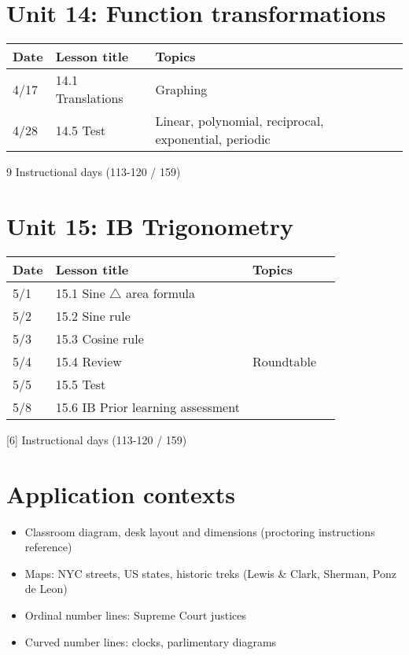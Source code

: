 \documentclass[12pt, twoside]{article}
\begin{document}
\section*{Unit 14: Function transformations}
\begin{tabular}{|p{0.9cm}|p{4cm}|p{7cm}|p{5cm}|}
  \hline
  Date & Lesson title & Topics  &  \\
  \hline
  4/17 & 14.1 Translations & Graphing &  \\
  \hline
  4/28 & 14.5 Test & Linear, polynomial, reciprocal, exponential, periodic &  \\
  \hline


\end{tabular} \par \vspace*{0.3cm}
9 Instructional days (113-120 / 159)

\section*{Unit 15: IB Trigonometry}
\begin{tabular}{|p{0.9cm}|p{4cm}|p{7cm}|p{5cm}|}
  \hline
  Date & Lesson title & Topics  &  \\
  \hline
  5/1 & 15.1 Sine $\triangle$ area formula &  &  \\
  \hline
  5/2 & 15.2 Sine rule &  &  \\
  \hline
  5/3 & 15.3 Cosine rule &  &  \\
  \hline
  5/4 & 15.4 Review & Roundtable &  \\
  \hline
  5/5 & 15.5 Test &  &  \\
  \hline
  5/8 & 15.6 IB Prior learning assessment &  &  \\
  \hline

\end{tabular} \par \vspace*{0.3cm}
[6] Instructional days (113-120 / 159)


\newpage
\section*{Application contexts}
\begin{itemize}
  \item Classroom diagram, desk layout and dimensions (proctoring instructions reference)
  \item Maps: NYC streets, US states, historic treks (Lewis \& Clark, Sherman, Ponz de Leon)
  \item Ordinal number lines: Supreme Court justices
  \item Curved number lines: clocks, parlimentary diagrams
\end{itemize}
\end{document}
